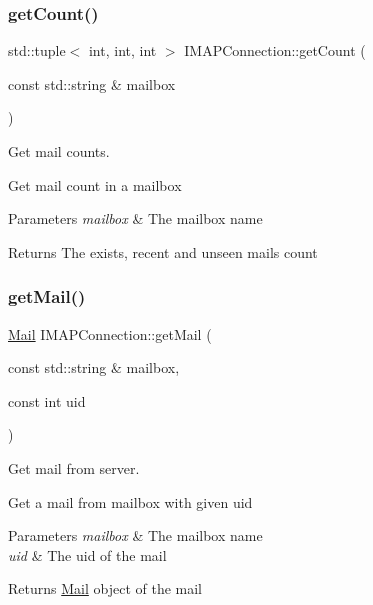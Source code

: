 \subsubsection{\texorpdfstring{get\+Count()}{getCount()}}
{\footnotesize\ttfamily std\+::tuple$<$ int, int, int $>$ I\+M\+A\+P\+Connection\+::get\+Count (\begin{DoxyParamCaption}\item[{const std\+::string \&}]{mailbox }\end{DoxyParamCaption})}



Get mail counts. 

Get mail count in a mailbox


\begin{DoxyParams}{Parameters}
{\em mailbox} & The mailbox name \\
\hline
\end{DoxyParams}
\begin{DoxyReturn}{Returns}
The exists, recent and unseen mails count 
\end{DoxyReturn}
\mbox{\label{classIMAPConnection_a0c9e1f027a1fb2b095f6dcdf8e4d8c47}} 
\subsubsection{\texorpdfstring{get\+Mail()}{getMail()}}
{\footnotesize\ttfamily \hyperlink{structMail}{Mail} I\+M\+A\+P\+Connection\+::get\+Mail (\begin{DoxyParamCaption}\item[{const std\+::string \&}]{mailbox,  }\item[{const int}]{uid }\end{DoxyParamCaption})}



Get mail from server. 

Get a mail from mailbox with given uid


\begin{DoxyParams}{Parameters}
{\em mailbox} & The mailbox name \\
\hline
{\em uid} & The uid of the mail\\
\hline
\end{DoxyParams}
\begin{DoxyReturn}{Returns}
\hyperlink{structMail}{Mail} object of the mail 
\end{DoxyReturn}
\mbox{\label{classIMAPConnection_a24f78f745447f09d6b9a989f5434f151}} 
